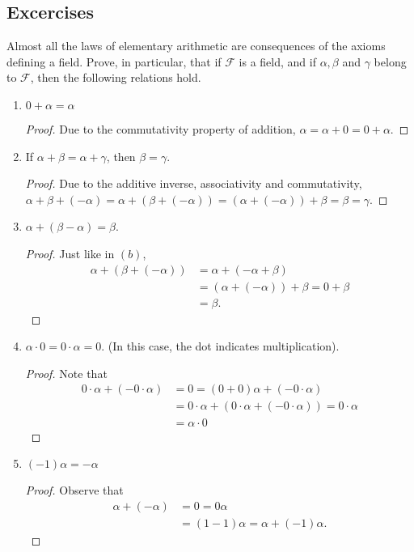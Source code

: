 \documentclass[12pt]{article}
\newenvironment{problem}[2][Problem]{\begin{trivlist} \item[\hskip \labelsep {\bfseries #1}\hskip \labelsep {\bfseries #2.}]}{\end{trivlist}}
\begin{document}
\subsection{Excercises}
\begin{problem}{1}
  Almost all the laws of elementary arithmetic are consequences of the axioms defining a field. Prove, in particular, that if $\mathcal{F}$ is a field, and if $\alpha,\beta$ and $\gamma$ belong to $\mathcal{F}$, then the following relations hold.
\begin{enumerate}
  \item $0+\alpha = \alpha$
\begin{proof}
  Due to the commutativity property of addition, $\alpha = \alpha + 0 = 0 + \alpha$.
\end{proof}
  \item If $\alpha + \beta = \alpha + \gamma$, then $\beta = \gamma$.
\begin{proof}
  Due to the additive inverse, associativity and commutativity, $\alpha + \beta + (-\alpha) = \alpha + (\beta + (-\alpha)) = ( \alpha + (-\alpha))+\beta = \beta = \gamma$.
\end{proof}
  \item $\alpha + (\beta-\alpha) = \beta$.
\begin{proof}
  Just like in $(b)$, 
\begin{align*}
  \alpha + (\beta+(-\alpha)) &= \alpha + (-\alpha + \beta)\\
  &= (\alpha + (-\alpha)) +\beta = 0 + \beta\\
  &= \beta.
\end{align*}
\end{proof}
\item $\alpha\cdot 0 = 0\cdot \alpha = 0$. (In this case, the dot indicates multiplication).
\begin{proof}
  Note that
\begin{align*}
  0\cdot \alpha + (-0\cdot\alpha) &= 0 = (0+0)\alpha + (-0\cdot\alpha)\\
  &= 0\cdot\alpha + (0\cdot\alpha + (-0\cdot\alpha)) = 0\cdot\alpha\\
  &= \alpha\cdot 0
\end{align*}
\end{proof}
\item $(-1)\alpha = -\alpha$
\begin{proof}
  Observe that
\begin{align*}
  \alpha + (-\alpha) &= 0 = 0\alpha\\
  &= (1-1)\alpha = \alpha + (-1)\alpha.

\end{align*}
\end{proof}
\end{enumerate}
\end{problem}
\end{document}
